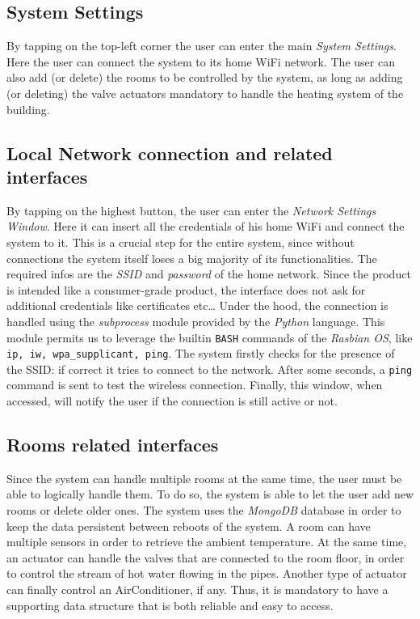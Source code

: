 \documentclass[a4paper]{article}
\begin{document}
        \subsection{System Settings}
        By tapping on the top-left corner the user can enter the main \emph{System Settings}. Here the user can connect the 
        system to its home WiFi network. The user can also add (or delete) the rooms to be controlled by the system, as long as adding (or deleting) the valve actuators mandatory to handle the heating system of the building.

        \subsection{Local Network connection and related interfaces}
        By tapping on the highest button, the user can enter the \emph{Network Settings Window}. Here it can insert all the credentials of his home WiFi and connect the system to it. This is a crucial step for the entire system, since without connections the system itself loses a big majority of its functionalities.
        The required infos are the \emph{SSID} and \emph{password} of the home network. Since the product is intended like a consumer-grade product, the interface does not ask for additional credentials like certificates etc\dots 
        Under the hood, the connection is handled using the \emph{subprocess} module provided by the \emph{Python} language. This module permits us to leverage the builtin \texttt{BASH}  commands of the \emph{Rasbian OS}, like \texttt{ip, iw, wpa\_supplicant, ping}.
        The system firstly checks for the presence of the SSID: if correct it tries to connect to the network. After some seconds, a \texttt{ping} command is sent to test the wireless connection.
        Finally, this window, when accessed, will notify the user if the connection is still active or not.

        \subsection{Rooms related interfaces}
        Since the system can handle multiple rooms at the same time, the user must be able to logically handle them. To do so, the system is able to let the user add new rooms or delete older ones. The system uses the \emph{MongoDB} database in order to keep the data persistent between reboots of the system.
        A room can have multiple sensors in order to retrieve the ambient temperature. At the same time, an actuator can handle the valves that are connected to the room floor, in order to control the stream of hot water flowing in the pipes.
        Another type of actuator can finally control an AirConditioner, if any.
        Thus, it is mandatory to have a supporting data structure that is both reliable and easy to access. 
\end{document}

